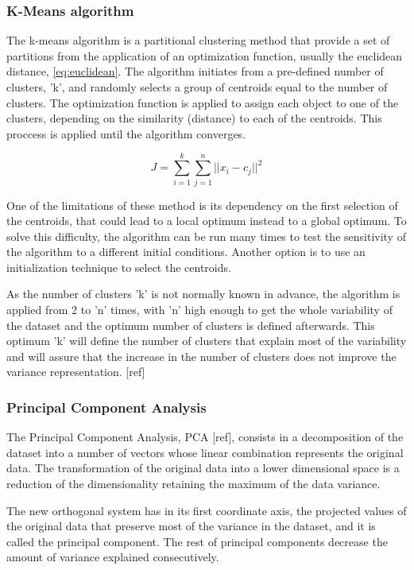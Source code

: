\subsubsection{K-Means algorithm}

The k-means algorithm is a partitional clustering method that provide a set of partitions from the application of an optimization function, usually the euclidean distance, \ref{eq:euclidean}. The algorithm initiates from a pre-defined number of clusters, 'k', and randomly selects a group of centroids equal to the number of clusters. The optimization function is applied to assign each object to one of the clusters, depending on the similarity (distance) to each of the centroids. This proccess is applied until the algorithm converges.

\begin{equation}\label{eq:euclidean}
    J =\sum_{i=1}^{k}\sum_{j=1}^{n}{||x_i-c_j||}^2
\end{equation}

One of the limitations of these method is its dependency on the first selection of the centroids, that could lead to a local optimum instead to a global optimum. To solve this difficulty, the algorithm can be run many times to test the sensitivity of the algorithm to a different initial conditions. Another option is to use an initialization technique to select the centroids.

As the number of clusters 'k' is not normally known in advance, the algorithm is applied from 2 to 'n' times, with 'n' high enough to get the whole variability of the dataset and the optimum number of clusters is defined afterwards. This optimum 'k' will define the number of clusters that explain most of the variability and will assure that the increase in the number of clusters does not improve the variance representation. [ref]

\subsubsection{Principal Component Analysis}

The Principal Component Analysis, PCA [ref], consists in a decomposition of the dataset into a number of vectors whose linear combination represents the original data. The transformation of the original data into a lower dimensional space is a reduction of the dimensionality retaining the maximum of the data variance.

The new orthogonal system has in its first coordinate axis, the projected values of the original data that preserve most of the variance in the dataset, and it is called the principal component. The rest of principal components decrease the amount of variance explained consecutively.

